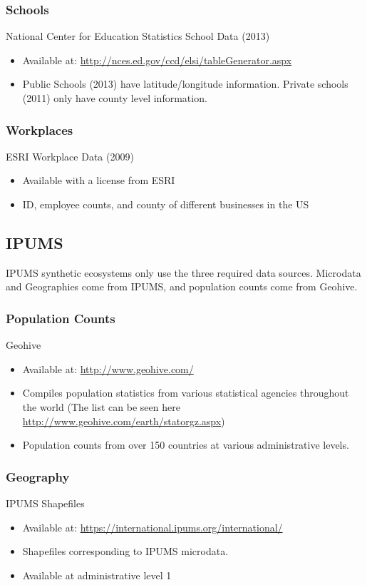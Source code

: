 \documentclass[font=9pt]{article}
\begin{document}
\subsubsection{Schools}
National Center for Education Statistics School Data (2013) \cite{elsi2015}
\begin{itemize}
	\item Available at: \url{http://nces.ed.gov/ccd/elsi/tableGenerator.aspx}
	\item Public Schools (2013) have latitude/longitude information. Private schools (2011) only have county level information. 
\end{itemize}

\subsubsection{Workplaces}		
ESRI Workplace Data (2009) \cite{esriBusiness}
\begin{itemize}
	\item Available with a license from ESRI
	\item ID, employee counts, and county of different businesses in the US
\end{itemize}

\subsection{IPUMS}
IPUMS synthetic ecosystems only use the three required data sources. Microdata and Geographies come from IPUMS, and population counts come from Geohive.

\subsubsection{Population Counts}
Geohive \cite{geohive}
\begin{itemize}
	\item Available at: \url{http://www.geohive.com/}
	\item Compiles population statistics from various statistical agencies throughout the world (The list can be seen here \url{http://www.geohive.com/earth/statorgz.aspx})
	\item Population counts from over 150 countries at various administrative levels. 
\end{itemize}

\subsubsection{Geography}
IPUMS Shapefiles \cite{ipumsi}
\begin{itemize}
	\item Available at: \url{https://international.ipums.org/international/}
	\item Shapefiles corresponding to IPUMS microdata. 
	\item Available at administrative level 1 
\end{itemize}
\end{document}
